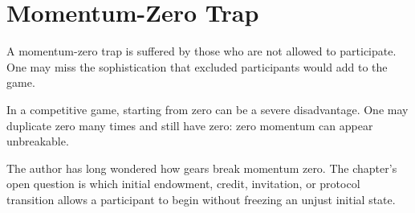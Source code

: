 \chapter{Momentum-Zero Trap}
\label{chap:momentum-zero-trap}


A momentum-zero trap is suffered by those who are not allowed to participate.
One may miss the sophistication that excluded participants would add to the
game.

In a competitive game, starting from zero can be a severe disadvantage. One
may duplicate zero many times and still have zero: zero momentum can appear
unbreakable.

The author has long wondered how gears break momentum zero. The chapter's open
question is which initial endowment, credit, invitation, or protocol transition
allows a participant to begin without freezing an unjust initial state.
